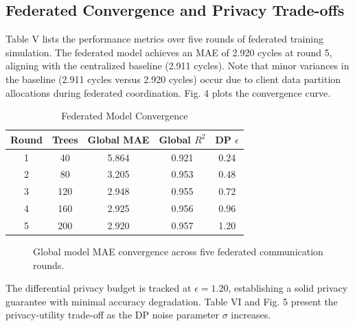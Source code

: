 \documentclass[letterpaper, 10 pt, conference]{ieeeconf}
\begin{document}
\subsection{Federated Convergence and Privacy Trade-offs}
\label{subsec:fl_conv_dp}
Table V lists the performance metrics over five rounds of federated training simulation. The federated model achieves an MAE of 2.920 cycles at round 5, aligning with the centralized baseline (2.911 cycles). Note that minor variances in the baseline (2.911 cycles versus 2.920 cycles) occur due to client data partition allocations during federated coordination. Fig. 4 plots the convergence curve.

\begin{table}[htbp]
\caption{Federated Model Convergence}
\label{tab:fl}
\centering\small
\begin{tabular}{ccccc}
\toprule
\textbf{Round} & \textbf{Trees} & \textbf{Global MAE} & \textbf{Global $R^2$} & \textbf{DP $\epsilon$} \\
\midrule
1 & 40 & 5.864 & 0.921 & 0.24 \\
2 & 80 & 3.205 & 0.953 & 0.48 \\
3 & 120 & 2.948 & 0.955 & 0.72 \\
4 & 160 & 2.925 & 0.956 & 0.96 \\
5 & 200 & 2.920 & 0.957 & 1.20 \\
\bottomrule
\end{tabular}
\end{table}

\begin{figure}[htbp]
\centering
{}
\caption{Global model MAE convergence across five federated communication rounds.}
\label{fig:fl_conv}
\end{figure}

The differential privacy budget is tracked at $\epsilon = 1.20$, establishing a solid privacy guarantee with minimal accuracy degradation. Table VI and Fig. 5 present the privacy-utility trade-off as the DP noise parameter $\sigma$ increases.
\end{document}
